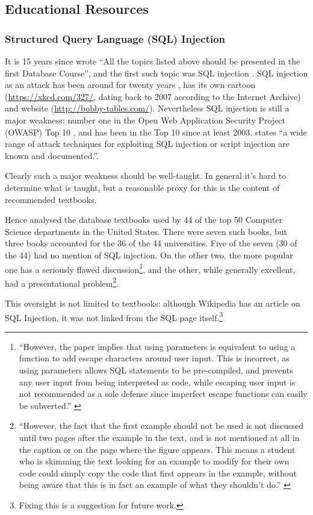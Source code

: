 \documentclass[conference]{IEEEtran}
\begin{document}
\subsection{Educational Resources}\label{sec:EDResource}
\subsubsection{Structured Query Language (SQL) Injection}\label{sec:SQL}
It is 15 years since \cite{Guimaraesetal2004} 
wrote ``All the topics listed above should be presented in the first
Database Course'', and the first such topic was SQL injection \cite{SPIDynamics2002,Anonymous2018b}. SQL injection as an attack has been around for twenty years \cite{HornerHyslip2017a}, has its own cartoon (\url{https://xkcd.com/327/}, dating back to 2007 according to the Internet Archive) and website (\url{http://bobby-tables.com/}). Nevertheless SQL injection is still a major weakness: number one in the Open Web Application Security Project (OWASP) Top 10 \cite{OWASP2017a}, and has been in the Top 10 since at least 2003.  \cite[the UK's definitive reference]{Bristol2018a} states ``a wide range of attack techniques for exploiting SQL
injection or script injection are known and documented.''.

Clearly such a major weakness should be well-taught.  In general it's hard to determine what is taught, but a reasonable proxy for this is the content of recommended textbooks. 

Hence \cite{Drop2019} analysed the database textbooks used by  44 of the top 50 Computer Science
departments in the United States. %
There were seven such books, but three books accounted for the 36 of the 44 universities. Five of the seven (30 of the 44) had no mention of SQL injection. On the other two, the more popular one has a seriously flawed discussion\footnote{``However, the paper implies that using parameters is equivalent to using a function to add escape characters
around user input. This is incorrect, as using parameters allows
SQL statements to be pre-compiled, and prevents any user input
from being interpreted as code, while escaping user input is not
recommended as a sole defense since imperfect escape functions
can easily be subverted.'' \cite{Drop2019}}, and the other, while generally excellent, had a presentational problem\footnote{``However, the fact that the first
example should not be used is not discussed until two pages after
the example in the text, and is not mentioned at all in the caption or
on the page where the figure appears. This means a student who is
skimming the text looking for an example to modify for their own
code could simply copy the code that first appears in the example,
without being aware that this is in fact an example of what they
shouldn't do.'' \cite{Drop2019}}.
\par
This oversight is not limited to textbooks: although Wikipedia has an article on SQL Injection, it was not linked from the SQL page itself.\footnote{Fixing this is a suggestion for future work.}
\end{document}

